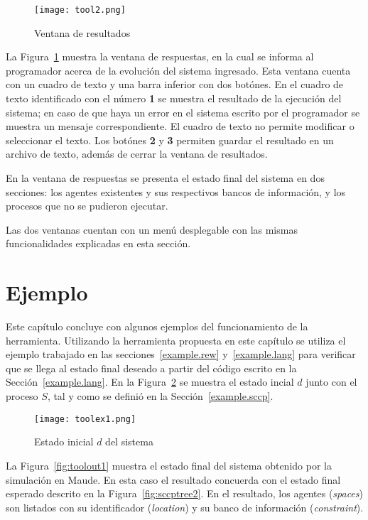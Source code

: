 \begin{figure}[htbp] %
   \centering
   \texttt{[image: tool2.png]} 
   \caption{Ventana de resultados}
   \label{fig:tool2}
\end{figure}

La Figura~\ref{fig:tool2} muestra la ventana de respuestas, en la cual se informa al programador acerca de la evoluci\'on del sistema ingresado. Esta ventana cuenta con un cuadro de texto y una barra inferior con dos bot\'ones. En el cuadro de texto identificado con el n\'umero \textbf{1} se muestra el resultado de la ejecuci\'on del sistema; en caso de que haya un error en el sistema escrito por el programador se muestra un mensaje correspondiente. El cuadro de texto no permite modificar o seleccionar el texto. Los bot\'ones \textbf{2} y \textbf{3} permiten guardar el resultado en un archivo de texto, adem\'as de cerrar la ventana de resultados.

En la ventana de respuestas se presenta el estado final del sistema en dos secciones: los agentes existentes y sus respectivos bancos de informaci\'on, y los procesos que no se pudieron ejecutar. 

Las dos ventanas cuentan con un men\'u desplegable con las mismas funcionalidades explicadas en esta secci\'on. 

\section{Ejemplo}
\label{example.envir}

Este cap\'itulo concluye con algunos ejemplos del funcionamiento de la herramienta. Utilizando la herramienta propuesta en este cap\'itulo se utiliza el ejemplo trabajado en las secciones~\ref{example.rew} y~\ref{example.lang} para verificar que se llega al estado final deseado a partir del c\'odigo escrito en la Secci\'on~\ref{example.lang}. En la Figura~\ref{fig:toolin1} se muestra el estado incial $d$ junto con el proceso $S$, tal y como se defini\'o en la Secci\'on~\ref{example.sccp}.

\begin{figure}[htbp] %
   \centering
   \texttt{[image: toolex1.png]} 
   \caption{Estado inicial $d$ del sistema}
   \label{fig:toolin1}
\end{figure}

La Figura~\ref{fig:toolout1} muestra el estado final del sistema obtenido por la simulaci\'on en Maude. En esta caso el resultado concuerda con el estado final esperado descrito en la Figura~\ref{fig:sccptree2}. En el resultado, los agentes (\textit{spaces}) son listados con su identificador (\textit{location}) y su banco de informaci\'on (\textit{constraint}). 

